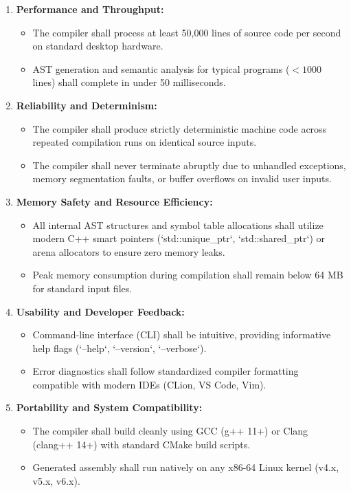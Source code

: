 \begin{enumerate}
    \item \textbf{Performance and Throughput:}
    \begin{itemize}
        \item The compiler shall process at least 50,000 lines of source code per second on standard desktop hardware.
        \item AST generation and semantic analysis for typical programs ($<1000$ lines) shall complete in under 50 milliseconds.
    \end{itemize}

    \item \textbf{Reliability and Determinism:}
    \begin{itemize}
        \item The compiler shall produce strictly deterministic machine code across repeated compilation runs on identical source inputs.
        \item The compiler shall never terminate abruptly due to unhandled exceptions, memory segmentation faults, or buffer overflows on invalid user inputs.
    \end{itemize}

    \item \textbf{Memory Safety and Resource Efficiency:}
    \begin{itemize}
        \item All internal AST structures and symbol table allocations shall utilize modern C++ smart pointers (`std::unique_ptr`, `std::shared_ptr`) or arena allocators to ensure zero memory leaks.
        \item Peak memory consumption during compilation shall remain below 64 MB for standard input files.
    \end{itemize}

    \item \textbf{Usability and Developer Feedback:}
    \begin{itemize}
        \item Command-line interface (CLI) shall be intuitive, providing informative help flags (`--help`, `--version`, `--verbose`).
        \item Error diagnostics shall follow standardized compiler formatting compatible with modern IDEs (CLion, VS Code, Vim).
    \end{itemize}

    \item \textbf{Portability and System Compatibility:}
    \begin{itemize}
        \item The compiler shall build cleanly using GCC (g++ 11+) or Clang (clang++ 14+) with standard CMake build scripts.
        \item Generated assembly shall run natively on any x86-64 Linux kernel (v4.x, v5.x, v6.x).
    \end{itemize}
\end{enumerate}

